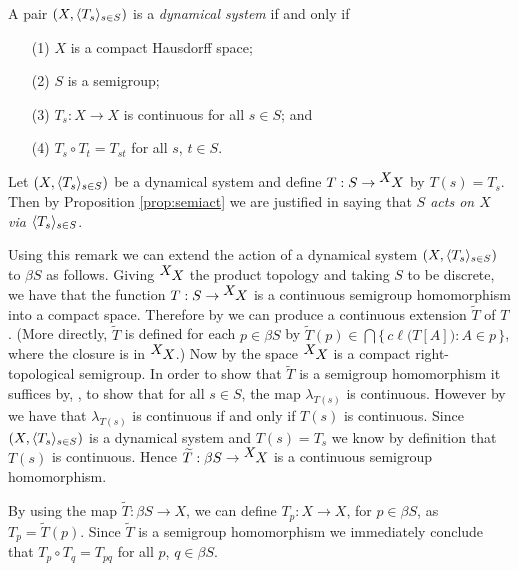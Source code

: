   \begin{defn}
    A pair $(X, \langle T_s \rangle_{s \in S})$ is a \textsl{dynamical system} if and only if
      \begin{itemize}
        \item[(1)] $X$ is a compact Hausdorff space;
        \item[(2)] $S$ is a semigroup;
        \item[(3)] $T_s : X \to X$ is continuous for all $s \in S$;
          and
        \item[(4)] $T_s \circ T_t = T_{st}$ for all $s$, $t \in S$.
      \end{itemize}
  \end{defn}

  \begin{rmk}
    Let $(X, \langle T_s \rangle_{s \in S})$ be a dynamical system and define $T : S \to
    \hbox{${}^{\hbox{$X$}}\hskip -1 pt X$}$ by $T(s) = T_s$.
    Then by Proposition \ref{prop:semiact} we are justified in saying
    that \textsl{$S$ acts on $X$ via $\langle T_s \rangle_{s \in S}$}.
  \end{rmk}

Using this remark we can extend the action of a dynamical system $(X, \langle T_s \rangle_{s \in S})$ to
$\beta S$ as follows.
Giving $\hbox{${}^{\hbox{$X$}}\hskip -1 pt X$}$ the product topology and taking $S$ to be 
discrete, we have that the function $T :
S \to \hbox{${}^{\hbox{$X$}}\hskip -1 pt X$}$ is a continuous semigroup
homomorphism into a compact space.
Therefore by \cite[Theorem 3.27]{Hindman:1998fk} we can produce a
continuous extension $\widetilde{T}$ of $T$.
(More directly, $\widetilde{T}$ is defined for each $p \in \beta S$ by
$\widetilde{T}(p) \in \bigcap \{\, c\ell\bigl( T[A] \bigr) : A \in p \,\}$, where
the closure is in $\hbox{${}^{\hbox{$X$}}\hskip -1 pt X$}$.)
Now by \cite[Theorem 2.22(a)]{Hindman:1998fk} the space $\hbox{${}^{\hbox{$X$}}\hskip -1 pt X$}$ is
a compact right-topological semigroup.
In order to show that $\widetilde{T}$ is a semigroup homomorphism it
suffices by, \cite[Corollary 4.22]{Hindman:1998fk}, to show that for all
$s \in S$, the
map $\lambda_{T(s)}$ is continuous.
However by \cite[Theorem 2.2(b)]{Hindman:1998fk} we have that
$\lambda_{T(s)}$ is continuous if and only if $T(s)$ is continuous. 
Since $(X, \langle T_s \rangle_{s \in S})$ is a dynamical system and $T(s) = T_s$ we know by
definition that $T(s)$ is continuous. 
Hence $\widetilde{T} : \beta S \to \hbox{${}^{\hbox{$X$}}\hskip -1 pt X$}$ is a continuous semigroup
homomorphism.

  \begin{rmk}
    By using the map $\widetilde{T} : \beta S \to X$, we can define
    $T_p : X \to X$, for $p \in \beta S$, as $T_p =
    \widetilde{T}(p)$. 
    Since $\widetilde{T}$ is a semigroup homomorphism we immediately
    conclude that $T_p \circ T_q = T_{pq}$ for all $p$, $q \in \beta
    S$.
   \end{rmk}

